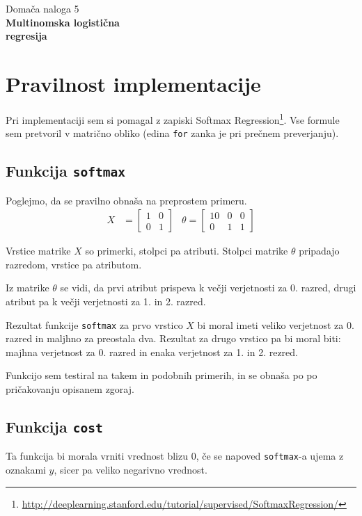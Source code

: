 \documentclass[10pt,a4paper]{article}
\begin{document}
{\huge Domača naloga 5} \\
{\Huge \textbf{Multinomska logistična \\regresija}} 

\section*{Pravilnost implementacije}
Pri implementaciji sem si pomagal z zapiski Softmax Regression\footnote{\url{http://deeplearning.stanford.edu/tutorial/supervised/SoftmaxRegression/}}.
Vse formule sem pretvoril v matrično obliko (edina \texttt{for} zanka je pri prečnem preverjanju).

\subsection*{Funkcija \texttt{softmax}}
Poglejmo, da se pravilno obnaša na preprostem primeru.
\begin{align*}
	X &= \begin{bmatrix}
		1 & 0 \\
		0 & 1
	\end{bmatrix}
	&
	\theta = \begin{bmatrix}
		10 & 0 & 0 \\
		0 & 1 & 1
	\end{bmatrix}
\end{align*}

Vrstice matrike $X$ so primerki, stolpci pa atributi. Stolpci matrike $\theta$ pripadajo razredom, vrstice pa atributom.

Iz matrike $\theta$ se vidi, da prvi atribut prispeva k večji verjetnosti za 0. razred, drugi atribut pa k večji verjetnosti za
1. in 2. razred.

Rezultat funkcije \texttt{softmax} za prvo vrstico $X$ bi moral imeti veliko verjetnost za 0. razred in maljhno za preostala dva.
Rezultat za drugo vrstico pa bi moral biti: majhna verjetnost za 0. razred in enaka verjetnost za 1. in 2. rezred.

Funkcijo sem testiral na takem in podobnih primerih, in se obnaša po po pričakovanju opisanem zgoraj.

\subsection*{Funkcija \texttt{cost}}
Ta funkcija bi morala vrniti vrednost blizu 0, če se napoved \texttt{softmax}-a ujema z oznakami $y$, sicer pa
veliko negarivno vrednost.
\end{document}
